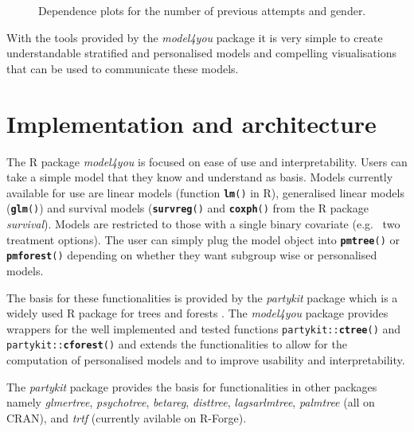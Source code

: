 \documentclass{josr}\usepackage[]{graphicx}\usepackage[]{color}
\makeatletter
\newcommand{\hlstd}[1]{\textcolor[rgb]{0.345,0.345,0.345}{#1}}%
\newcommand{\hlkwd}[1]{\textcolor[rgb]{0.737,0.353,0.396}{\textbf{#1}}}%
\newenvironment{knitrout}{}{} %
\newcommand{\new}[1]{{\color{blue} #1}}
\newcommand*{\textalltt}{}
\DeclareRobustCommand*{\textalltt}{%
  \begingroup
    \let\do\@makeother
    \dospecials
    \catcode`\\=\z@
    \catcode`\{=\@ne
    \catcode`\}=\tw@
    \verbatim@font\@noligs
    \@vobeyspaces
    \frenchspacing
    \@textalltt
}
\newcommand*{\@textalltt}[1]{%
    #1%
  \endgroup
}
\makeatother
\begin{document}
\begin{knitrout}
\begin{figure}
{}

\caption[Dependence plots for the number of previous attempts and gender]{Dependence plots for the number of previous attempts and gender.}\label{fig:math_dp2}
\end{figure}


\end{knitrout}

With the tools provided by the \emph{model4you} package it is very
simple to create understandable stratified and personalised models
and compelling visualisations that can be used to communicate these
models.



\section*{Implementation and architecture}
The R package \emph{model4you} is focused on ease of use and
interpretability.  Users can take a simple model that they know and
understand as basis.
\new{
Models currently available for use are linear models (function
\texttt{\hlkwd{lm}\hlstd{()}} in R), generalised linear models (\texttt{\hlkwd{glm}\hlstd{()}}) and
survival models (\texttt{\hlkwd{survreg}\hlstd{()}} and \texttt{\hlkwd{coxph}\hlstd{()}} from the R
package \emph{survival}).  Models are restricted to those with a
single binary covariate (e.g.~ two treatment options).  The user can
simply plug the model object into \texttt{\hlkwd{pmtree}\hlstd{()}} or
\texttt{\hlkwd{pmforest}\hlstd{()}} depending on whether they want subgroup wise or
personalised models.
}

The basis for these functionalities is provided by the
\emph{partykit} package which is a widely used R package for trees
and forests \citep{hothorn_partykit_2015, hothorn_partykit_2017}.
The \emph{model4you} package provides wrappers for the well
implemented and tested functions \texttt{\hlstd{partykit}\textalltt{::}\hlkwd{ctree}\hlstd{()}} and
\texttt{\hlstd{partykit}\textalltt{::}\hlkwd{cforest}\hlstd{()}} and extends the functionalities to
allow for the computation of personalised models and to improve
usability and interpretability.

The \emph{partykit} package provides the basis for functionalities in
other packages namely \emph{glmertree}, \emph{psychotree},
\emph{betareg}, \emph{disttree}, \emph{lagsarlmtree}, \emph{palmtree}
(all on CRAN), and \emph{trtf} (currently avilable on R-Forge).

\end{document}
